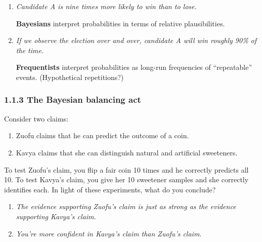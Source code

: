 \documentclass{beamer}
\begin{document}
\begin{frame}
    \begin{enumerate}
        \setlength\parskip{1em}
        \setlength\itemsep{1em}
        \item \textit{Candidate A is nine times more likely to win than to lose.}
        
        
        \textbf{Bayesians} interpret probabilities in terms of relative plausibilities.

        \item \textit{If we observe the election over and over, candidate A will win roughly 90\% of the time.}
            
        \textbf{Frequentists} interpret probabilities as long-run frequencies of ``repeatable'' events. (Hypothetical repetitions?)
    \end{enumerate}
\end{frame}

\begin{frame}
    \setlength\parskip{1em}
    \frametitle{1.1.3 The Bayesian balancing act}

    Consider two claims:
    \begin{enumerate}
        \setlength\itemsep{1em}
        \item[(a)] Zuofu claims that he can predict the outcome of a coin.
        \item[(b)] Kavya claims that she can distinguish natural and artificial sweeteners.
    \end{enumerate}
    
    To test Zuofu's claim, you flip a fair coin 10 times and he correctly predicts all 10.
    To test Kavya's claim, you give her 10 sweetener samples and she correctly identifies each.
    In light of these experiments, what do you conclude?

    \begin{enumerate}
        \setlength\itemsep{1em}
        \item \textit{The evidence supporting Zuofu's claim is just as strong as the evidence
        supporting Kavya's claim.}
        \item \textit{You're more confident in Kavya's claim than Zuofu's claim.}
    \end{enumerate}
\end{frame}
\end{document}
